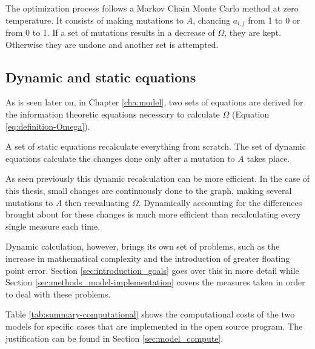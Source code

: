 The optimization process follows a Markov Chain Monte Carlo method at zero temperature.
It consists of making mutations to $A$, chancing $a_{i,j}$ from 1 to 0 or from 0 to 1.
If a set of mutations results in a decrease of $\Omega$, they are kept.
Otherwise they are undone and another set is attempted.

\subsection{Dynamic and static equations}
\label{sec:introduction_model_dynamic-static}

As is seen later on, in Chapter \ref{cha:model}, two sets of equations are derived for the information theoretic equations necessary to calculate $\Omega$ (Equation \eqref{eq:definition-Omega}).

A set of static equations recalculate everything from scratch.
The set of dynamic equations calculate the changes done only after a mutation to $A$ takes place.

As seen previously this dynamic recalculation can be more efficient.
In the case of this thesis, small changes are continuously done to the graph, making several mutations to $A$ then reevaluating $\Omega$.
Dynamically accounting for the differences brought about for these changes is much more efficient than recalculating every single measure each time.

Dynamic calculation, however, brings its own set of problems, such as the increase in mathematical complexity and the introduction of greater floating point error.
Section \ref{sec:introduction_goals} goes over this in more detail while Section \ref{sec:methods_model-implementation} covers the measures taken in order to deal with these problems.

Table \ref{tab:summary-computational} shows the computational costs of the two models for specific cases that are implemented in the \CC{} open source program.
The justification can be found in Section \ref{sec:model_compute}.

